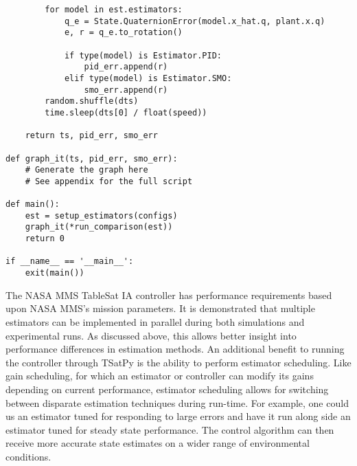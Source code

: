 \begin{singlespace}
\begin{verbatim}
        for model in est.estimators:
            q_e = State.QuaternionError(model.x_hat.q, plant.x.q)
            e, r = q_e.to_rotation()

            if type(model) is Estimator.PID:
                pid_err.append(r)
            elif type(model) is Estimator.SMO:
                smo_err.append(r)
        random.shuffle(dts)
        time.sleep(dts[0] / float(speed))

    return ts, pid_err, smo_err

def graph_it(ts, pid_err, smo_err):
    # Generate the graph here
    # See appendix for the full script

def main():
    est = setup_estimators(configs)
    graph_it(*run_comparison(est))
    return 0

if __name__ == '__main__':
    exit(main())
  \end{verbatim}
\nocite{minted}
\end{singlespace}

The NASA MMS TableSat IA controller has performance requirements based upon NASA MMS's mission parameters.  It is demonstrated that multiple estimators can be implemented in parallel during both simulations and experimental runs.  As discussed above, this allows better insight into performance differences in estimation methods.  An additional benefit to running the controller through TSatPy is the ability to perform estimator scheduling.  Like gain scheduling, for which an estimator or controller can modify its gains depending on current performance, estimator scheduling allows for switching between disparate estimation techniques during run-time.  For example, one could us an estimator tuned for responding to large errors and have it run along side an estimator tuned for steady state performance.  The control algorithm can then receive more accurate state estimates on a wider range of environmental conditions.
